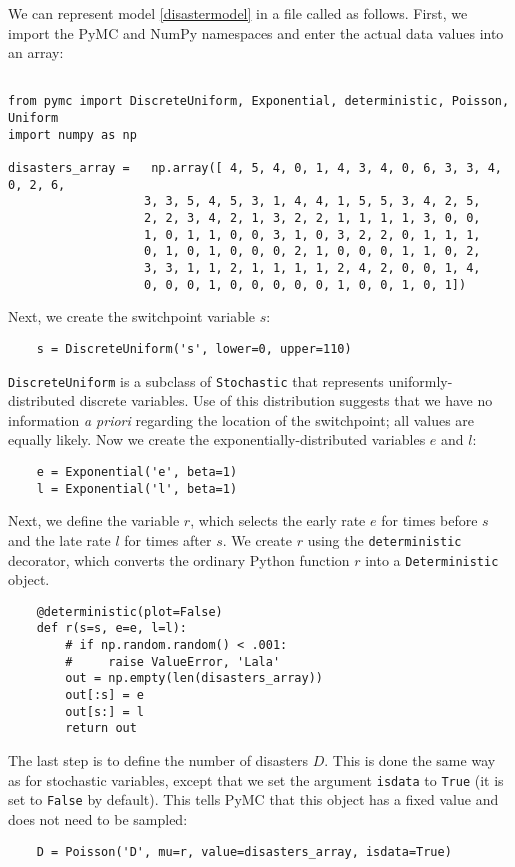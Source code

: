 We can represent model \ref{disastermodel} in a file called  as follows. First, we import the PyMC and NumPy namespaces and enter the actual data values into an array:
\begin{verbatim}
	
from pymc import DiscreteUniform, Exponential, deterministic, Poisson, Uniform
import numpy as np

disasters_array =   np.array([ 4, 5, 4, 0, 1, 4, 3, 4, 0, 6, 3, 3, 4, 0, 2, 6,
                   3, 3, 5, 4, 5, 3, 1, 4, 4, 1, 5, 5, 3, 4, 2, 5,
                   2, 2, 3, 4, 2, 1, 3, 2, 2, 1, 1, 1, 1, 3, 0, 0,
                   1, 0, 1, 1, 0, 0, 3, 1, 0, 3, 2, 2, 0, 1, 1, 1,
                   0, 1, 0, 1, 0, 0, 0, 2, 1, 0, 0, 0, 1, 1, 0, 2,
                   3, 3, 1, 1, 2, 1, 1, 1, 1, 2, 4, 2, 0, 0, 1, 4,
                   0, 0, 0, 1, 0, 0, 0, 0, 0, 1, 0, 0, 1, 0, 1])
\end{verbatim} 
Next, we create the switchpoint variable $s$:
\begin{verbatim}
	s = DiscreteUniform('s', lower=0, upper=110)   
\end{verbatim}
\texttt{DiscreteUniform} is a subclass of \texttt{Stochastic} that represents uniformly-distributed discrete variables. Use of this distribution suggests that we have no information \emph{a priori} regarding the location of the switchpoint; all values are equally likely. Now we create the exponentially-distributed variables $e$ and $l$:
\begin{verbatim}
   	e = Exponential('e', beta=1)
	l = Exponential('l', beta=1)   
\end{verbatim}
Next, we define the variable $r$, which selects the early rate $e$ for times before $s$ and the late rate $l$ for times after $s$. We create $r$ using the \texttt{deterministic} decorator, which converts the ordinary Python function $r$ into a \texttt{Deterministic} object.
\begin{verbatim}
	@deterministic(plot=False)
	def r(s=s, e=e, l=l):
	    # if np.random.random() < .001:
	    #     raise ValueError, 'Lala'
	    out = np.empty(len(disasters_array))
	    out[:s] = e
	    out[s:] = l
	    return out
\end{verbatim}
The last step is to define the number of disasters $D$. This is done the same way as for stochastic variables, except that we set the argument \texttt{isdata} to \texttt{True} (it is set to \texttt{False} by default). This tells PyMC that this object has a fixed value and does not need to be sampled:
\begin{verbatim}
	D = Poisson('D', mu=r, value=disasters_array, isdata=True)
\end{verbatim}

